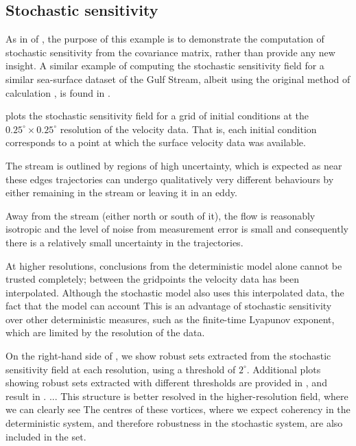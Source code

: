 

\subsection{Stochastic sensitivity}
As in  of , the purpose of this example is to demonstrate the computation of stochastic sensitivity from the covariance matrix, rather than provide any new insight.
A similar example of computing the stochastic sensitivity field for a similar sea-surface dataset of the Gulf Stream, albeit using the original method of calculation \citep{Balasuriya_2020_StochasticSensitivityComputable}, is found in \citet{BadzaEtAl_2023_HowSensitiveAre}.

 plots the stochastic sensitivity field for a grid of initial conditions at the \(0.25^\circ \times 0.25^\circ\) resolution of the velocity data.
That is, each initial condition corresponds to a point at which the surface velocity data was available.


The stream is outlined by regions of high uncertainty, which is expected as near these edges trajectories can undergo qualitatively very different behaviours by either remaining in the stream or leaving it in an eddy.

Away from the stream (either north or south of it), the flow is reasonably isotropic and the level of noise from measurement error is small and consequently there is a relatively small uncertainty in the trajectories.

At higher resolutions, conclusions from the deterministic model alone cannot be trusted completely; between the gridpoints the velocity data has been interpolated.
Although the stochastic model also uses this interpolated data, the fact that the model can account
This is an advantage of stochastic sensitivity over other deterministic measures, such as the finite-time Lyapunov exponent, which are limited by the resolution of the data.




On the right-hand side of , we show robust sets extracted from the stochastic sensitivity field at each resolution, using a threshold of \(2^\circ\).
Additional plots showing robust sets extracted with different thresholds are provided in , and result in .
...
This structure is better resolved in the higher-resolution field, where we can clearly see
The centres of these vortices, where we expect coherency in the deterministic system, and therefore robustness in the stochastic system, are also included in the set.



